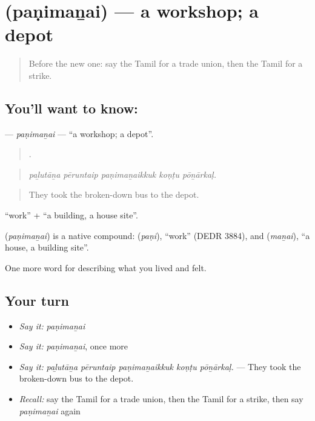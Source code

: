 \section[\texorpdfstring{\ta{பணிமனை} (paṇimaṉai)}{பணிமனை (paṇimaṉai)}]{ (paṇimaṉai) — a workshop; a depot}

\label{lesson:TA-C514-panimanai}



\begin{quote}
Before the new one: say the Tamil for a trade union, then the Tamil for a strike.
\end{quote}

\subsection*{You'll want to know: }
\textbf{} — \emph{paṇimaṉai} — \textquotedblleft{}a workshop; a depot\textquotedblright{}.

\begin{quote}
    .
\end{quote}

\begin{quote}
\emph{paḻutāṉa pēruntaip paṇimaṉaikkuk koṇṭu pōṉārkaḷ.}
\end{quote}

\begin{quote}
They took the broken-down bus to the depot.
\end{quote}

 \textquotedblleft{}work\textquotedblright{} +  \textquotedblleft{}a building, a house site\textquotedblright{}.

\begin{cousinweb}
\textbf{} (\emph{paṇimaṉai}) is a native compound:  (\emph{paṇi}), \textquotedblleft{}work\textquotedblright{} (DEDR 3884), and  (\emph{maṉai}), \textquotedblleft{}a house, a building site\textquotedblright{}.
\end{cousinweb}

\begin{grammarlens}[title={What you've built}]
One more word for describing what you lived and felt.
\end{grammarlens}

\subsection*{Your turn}
\begin{itemize}
\raggedright
  \item \emph{Say it:} \emph{paṇimaṉai}
  \item \emph{Say it:} \emph{paṇimaṉai}, once more
  \item \emph{Say it:} \emph{paḻutāṉa pēruntaip paṇimaṉaikkuk koṇṭu pōṉārkaḷ.} — They took the broken-down bus to the depot.
  \item \emph{Recall:} say the Tamil for a trade union, then the Tamil for a strike, then say \emph{paṇimaṉai} again
\end{itemize}

